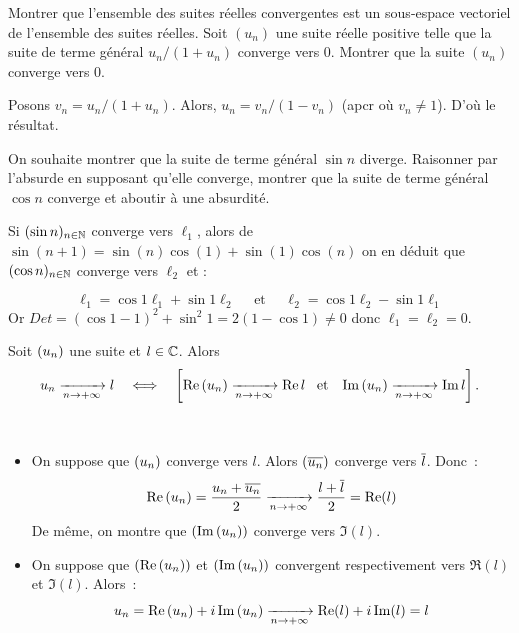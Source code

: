 \documentclass{magnoliaold}
\begin{document}
\begin{exos}
\exo Montrer que l'ensemble des suites réelles convergentes est un sous-espace
  vectoriel de l'ensemble des suites réelles.
\exo Soit $(u_n)$ une suite réelle positive telle que la suite de
  terme général $u_n/(1+u_n)$ converge vers 0. Montrer que la suite $(u_n)$
  converge vers 0.
  
  \begin{sol}
  Posons $v_n=u_n/(1+u_n)$. Alors, $u_n=v_n/(1-v_n)$ (apcr où $v_n\neq 1$). D'où le résultat.
  \end{sol}
\exo On souhaite montrer que la suite de terme général $\sin n$ diverge.
  Raisonner par l'absurde en supposant qu'elle converge, montrer que
  la suite de terme général $\cos n$ converge et aboutir à une absurdité.
  \begin{sol}
  Si $(\sin n)_{n\in\mathbb{N}}$ converge vers $\ell_1$, alors de $\sin(n+1)=\sin(n)\cos(1)+\sin(1)\cos(n)$ on en déduit que $(\cos n)_{n\in\mathbb{N}}$ converge vers $\ell_2$ et :
  
    \[\ell_1 = \cos 1 \ell_1 + \sin 1 \ell_2 \quad \text{ et } \quad  \ell_2 = \cos 1 \ell_2 - \sin 1 \ell_1\]
Or $Det = (\cos 1-1)^2 + \sin^2 1 = 2(1-\cos 1)\neq 0$ donc  $\ell_1=\ell_2=0$.
    \end{sol}
\end{exos}

\begin{proposition}[utile=-3]
Soit $\left(u_n\right)$ une suite et $l\in\mathbb{C}$. Alors
\[u_n \xrightarrow[n\rightarrow +\infty]{} l \quad\Longleftrightarrow\quad
  \left[\mathop{\rm Re}\left(u_n\right)\xrightarrow[n\rightarrow +\infty]{}\mathop{\rm Re}l \quad\!\text{et}\quad\!
       \mathop{\rm Im}\left(u_n\right)\xrightarrow[n\rightarrow +\infty]{}\mathop{\rm Im}l\right].\] 
\end{proposition}

\begin{preuve}
$\quad$
\begin{itemize}
\item On suppose que $\left(u_n\right)$ converge vers $l$. Alors $\left(\overline{u_n}\right)$ 
  converge vers $\overline{l}$. Donc~:
  \[\mathop{\rm Re}\left(u_n\right)=\frac{u_n+\overline{u_n}}{2}\xrightarrow[n\rightarrow +\infty]{}
    \frac{l+\overline{l}}{2}=\mathop{\rm Re}(l)\]
  De même, on montre que $\left(\mathop{\rm Im}\left(u_n\right)\right)$ converge vers $\Im(l)$.
\item On suppose que $\left(\mathop{\rm Re}\left(u_n\right)\right)$ et $\left(\mathop{\rm Im}\left(u_n\right)\right)$ convergent
  respectivement vers $\Re(l)$ et $\Im(l)$. Alors~:
  \[u_n=\mathop{\rm Re}\left(u_n\right)+i\mathop{\rm Im}\left(u_n\right)\xrightarrow[n\rightarrow +\infty]{} \mathop{\rm Re}(l)+i\mathop{\rm Im}(l)=l\]
\end{itemize}
\end{preuve}
\end{document}
